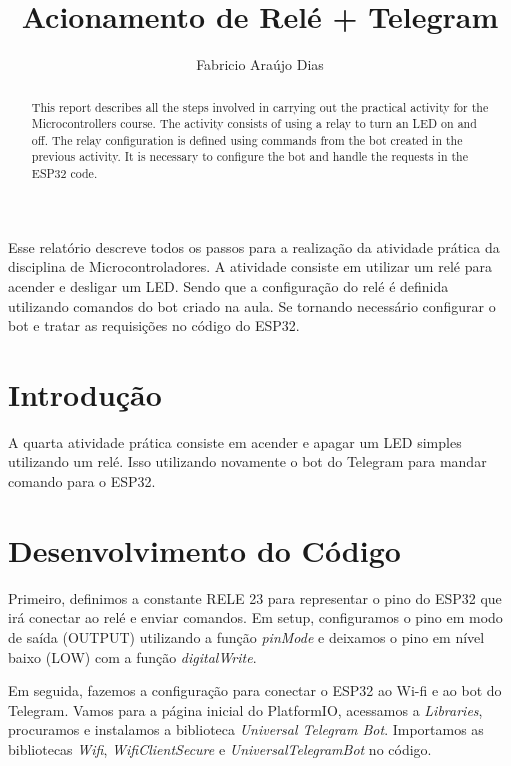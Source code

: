 \documentclass[12pt]{article}
\title{Acionamento de Relé + Telegram}
\author{Fabricio Araújo Dias}
\begin{document}
 

\maketitle

\begin{abstract}
  This report describes all the steps involved in carrying out the practical activity for the Microcontrollers course. The activity consists of using a relay to turn an LED on and off. The relay configuration is defined using commands from the bot created in the previous activity. It is necessary to configure the bot and handle the requests in the ESP32 code.
\end{abstract}
     
\begin{resumo} 
  Esse relatório descreve todos os passos para a realização da atividade prática da disciplina de Microcontroladores. A atividade consiste em utilizar um relé para acender e desligar um LED. Sendo que a configuração do relé é definida utilizando comandos do bot criado na aula. Se tornando necessário configurar o bot e tratar as requisições no código do ESP32.
\end{resumo}


\section{Introdução}\label{sec:introdução}
A quarta atividade prática consiste em acender e apagar um LED simples utilizando um relé. Isso utilizando novamente o bot do Telegram para mandar comando para o ESP32.

\section{Desenvolvimento do Código}\label{sec:desenvolvimento-do-código}

Primeiro, definimos a constante RELE 23 para representar o pino do ESP32 que irá conectar ao relé e enviar comandos. Em setup, configuramos o pino em modo de saída (OUTPUT) utilizando a função \textit{pinMode} e deixamos o pino em nível baixo (LOW) com a função \textit{digitalWrite}.

Em seguida, fazemos a configuração para conectar o ESP32 ao Wi-fi e ao bot do Telegram. Vamos para a página inicial do PlatformIO, acessamos a \textit{Libraries}, procuramos e instalamos a biblioteca \textit{Universal Telegram Bot}. Importamos as bibliotecas \textit{Wifi}, \textit{WifiClientSecure} e \textit{UniversalTelegramBot} no código. 
\end{document}
